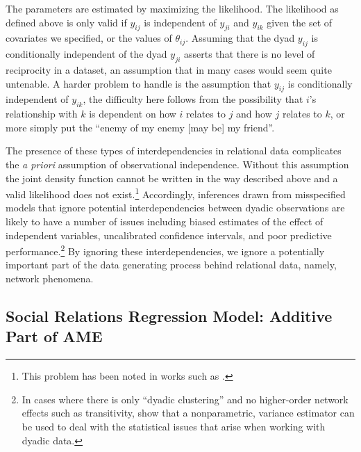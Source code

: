 \documentclass[12pt,pdflatex]{elsarticle}
\begin{document}
The parameters are estimated by maximizing the likelihood. The likelihood as defined above is only valid if  $y_{ij}$ is independent of $y_{ji}$ and $y_{ik}$ given the set of covariates we specified, or the values of $\theta_{ij}$.
 Assuming that the dyad $y_{ij}$ is conditionally independent of the dyad $y_{ji}$ asserts that there is no level of reciprocity in a dataset, an assumption that in many cases would seem quite untenable.
 A harder problem to handle is the assumption that $y_{ij}$ is conditionally independent of $y_{ik}$, the difficulty here follows from the possibility that $i$'s relationship with $k$ is dependent on how $i$ relates to $j$ and how $j$ relates to $k$, or more simply put the ``enemy of my enemy [may be] my friend''. 

The presence of these types of interdependencies in relational data complicates the \textit{a priori} assumption of observational independence. Without this assumption the joint density function cannot be written in the way described above and  a valid likelihood does not exist.\footnote{This problem has been noted in works such as \citet{lai:1995,manger:etal:2012,kinne:2013}.} Accordingly, inferences drawn from misspecified models that ignore potential interdependencies between dyadic observations are likely to have a number of issues including biased estimates of the effect of independent variables, uncalibrated confidence intervals, and poor predictive performance.\footnote{In cases where there is only ``dyadic clustering'' and no higher-order network effects such as transitivity, \citet{aronow:etal:2015} show that a nonparametric, variance estimator can be used to deal with the statistical issues that arise when working with dyadic data.} By ignoring these interdependencies, we ignore a potentially important part of the data generating process behind relational data, namely, network phenomena. 

\subsection{Social Relations Regression Model: Additive Part of AME}
\end{document}
